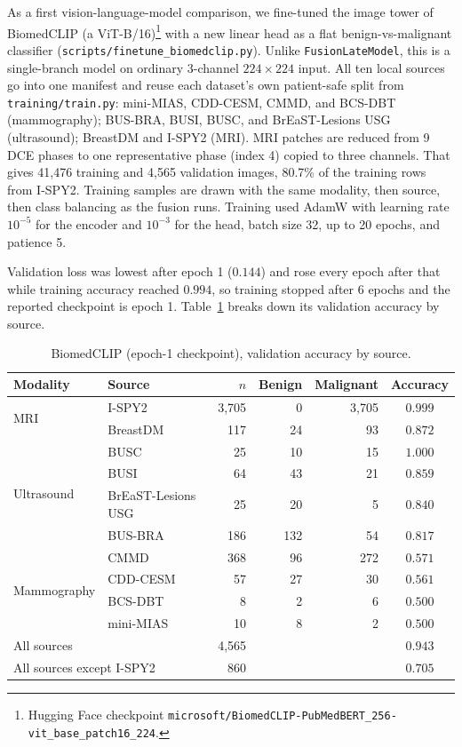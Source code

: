 \documentclass[11pt]{article}
\begin{document}
As a first vision-language-model comparison, we fine-tuned the image tower
of BiomedCLIP \citep{zhang2023biomedclip} (a ViT-B/16)\footnote{Hugging
Face checkpoint
\nolinkurl{microsoft/BiomedCLIP-PubMedBERT_256-vit_base_patch16_224}.}
with a new linear head as a flat benign-vs-malignant classifier
(\nolinkurl{scripts/finetune_biomedclip.py}). Unlike \texttt{FusionLateModel},
this is a single-branch model on ordinary 3-channel $224\times224$ input.
All ten local sources go into one manifest and reuse each dataset's own
patient-safe split from \texttt{training/train.py}: mini-MIAS, CDD-CESM,
CMMD, and BCS-DBT (mammography); BUS-BRA, BUSI, BUSC, and BrEaST-Lesions
USG (ultrasound); BreastDM and I-SPY2 (MRI). MRI patches are reduced from 9
DCE phases to one representative phase (index 4) copied to three channels.
That gives 41{,}476 training and 4{,}565 validation images, 80.7\% of the
training rows from I-SPY2. Training samples are drawn with the same
modality, then source, then class balancing as the fusion runs. Training
used AdamW with learning rate $10^{-5}$ for the encoder and $10^{-3}$ for
the head, batch size 32, up to 20 epochs, and patience 5.

Validation loss was lowest after epoch 1 ($0.144$) and rose every epoch
after that while training accuracy reached $0.994$, so training stopped
after 6 epochs and the reported checkpoint is epoch 1.
Table~\ref{tab:biomedclip} breaks down its validation accuracy by source.

\begin{table}[htbp]
  \centering
  \caption{BiomedCLIP (epoch-1 checkpoint), validation accuracy by source.}
  \label{tab:biomedclip}
  \begin{tabular}{llrrrc}
    \toprule
    Modality & Source & $n$ & Benign & Malignant & Accuracy \\
    \midrule
    \multirow{2}{*}{MRI} & I-SPY2 & 3{,}705 & 0 & 3{,}705 & $0.999$ \\
     & BreastDM & 117 & 24 & 93 & $0.872$ \\
    \midrule
    \multirow{4}{*}{Ultrasound} & BUSC & 25 & 10 & 15 & $1.000$ \\
     & BUSI & 64 & 43 & 21 & $0.859$ \\
     & BrEaST-Lesions USG & 25 & 20 & 5 & $0.840$ \\
     & BUS-BRA & 186 & 132 & 54 & $0.817$ \\
    \midrule
    \multirow{4}{*}{Mammography} & CMMD & 368 & 96 & 272 & $0.571$ \\
     & CDD-CESM & 57 & 27 & 30 & $0.561$ \\
     & BCS-DBT & 8 & 2 & 6 & $0.500$ \\
     & mini-MIAS & 10 & 8 & 2 & $0.500$ \\
    \midrule
    \multicolumn{2}{l}{All sources} & 4{,}565 & & & $0.943$ \\
    \multicolumn{2}{l}{All sources except I-SPY2} & 860 & & & $\mathbf{0.705}$ \\
    \bottomrule
  \end{tabular}
\end{table}
\end{document}
